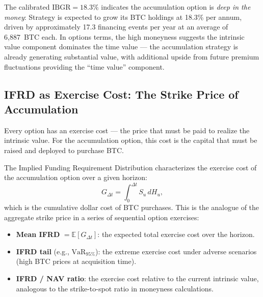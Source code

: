 \begin{remark}
\label{rem:ibgr_calibrated}
The calibrated $\mathrm{IBGR} = 18.3\%$ indicates the accumulation option is \emph{deep in the money}: Strategy is expected to grow its BTC holdings at 18.3\% per annum, driven by approximately 17.3 financing events per year at an average of 6,887~BTC each. In options terms, the high moneyness suggests the intrinsic value component dominates the time value --- the accumulation strategy is already generating substantial value, with additional upside from future premium fluctuations providing the ``time value'' component.
\end{remark}

\subsection{IFRD as Exercise Cost: The Strike Price of Accumulation}
\label{subsec:ifrd_strike}

Every option has an exercise cost --- the price that must be paid to realize the intrinsic value. For the accumulation option, this cost is the capital that must be raised and deployed to purchase BTC.

\begin{proposition}
\label{prop:ifrd_strike}
The Implied Funding Requirement Distribution characterizes the exercise cost of the accumulation option over a given horizon:
\begin{equation}
\label{eq:ifrd_strike}
  G_{\Delta t} = \int_0^{\Delta t} S_u\, dH_u,
\end{equation}
which is the cumulative dollar cost of BTC purchases. This is the analogue of the aggregate strike price in a series of sequential option exercises:
\begin{itemize}
  \item \textbf{Mean IFRD} $= \mathbb{E}[G_{\Delta t}]$: the expected total exercise cost over the horizon.
  \item \textbf{IFRD tail} (e.g., $\mathrm{VaR}_{95\%}$): the extreme exercise cost under adverse scenarios (high BTC prices at acquisition time).
  \item \textbf{IFRD / NAV ratio}: the exercise cost relative to the current intrinsic value, analogous to the strike-to-spot ratio in moneyness calculations.
\end{itemize}
\end{proposition}

